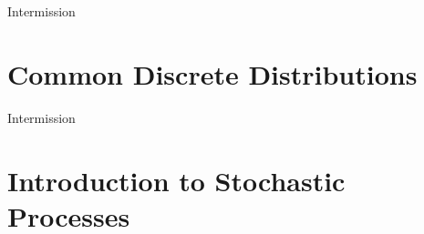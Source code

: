 \documentclass[10pt]{beamer}
\newcommand{\themename}{\textbf{\textsc{metropolis}}\xspace}
\begin{document}
\begin{frame}[standout]
Intermission
\end{frame}

\section{Common Discrete Distributions}

\begin{frame}[standout]
Intermission
\end{frame}

\section{Introduction to Stochastic Processes}
























\end{document}
